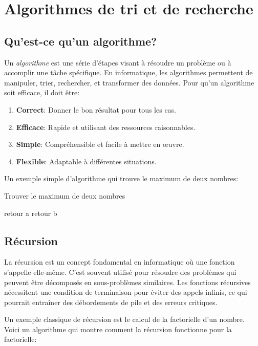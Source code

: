 \chapter{Algorithmes de tri et de recherche}

\section{Qu’est-ce qu’un algorithme?}

Un \emph{algorithme} est une série d'étapes visant à résoudre un problème ou à accomplir une tâche spécifique. En informatique, les algorithmes permettent de manipuler, trier, rechercher, et transformer des données. Pour qu'un algorithme soit efficace, il doit être:

\begin{enumerate}
	\item \textbf{Correct}: Donner le bon résultat pour tous les cas.
	\item \textbf{Efficace}: Rapide et utilisant des ressources raisonnables.
	\item \textbf{Simple}: Compréhensible et facile à mettre en œuvre.
	\item \textbf{Flexible}: Adaptable à différentes situations.
\end{enumerate}

Un exemple simple d'algorithme qui trouve le maximum de deux nombres:

\begin{algorithm}
	\caption{Trouver le maximum de deux nombres}
	\begin{algorithmic}
		\State retour a
		\Else
		\State retour b
		\EndIf
	\end{algorithmic}
\end{algorithm}

\section{Récursion}

La récursion est un concept fondamental en informatique où une fonction s'appelle elle-même. C'est souvent utilisé pour résoudre des problèmes qui peuvent être décomposés en sous-problèmes similaires. Les fonctions récursives nécessitent une condition de terminaison pour éviter des appels infinis, ce qui pourrait entraîner des débordements de pile et des erreurs critiques.

Un exemple classique de récursion est le calcul de la factorielle d'un nombre. Voici un algorithme qui montre comment la récursion fonctionne pour la factorielle:


